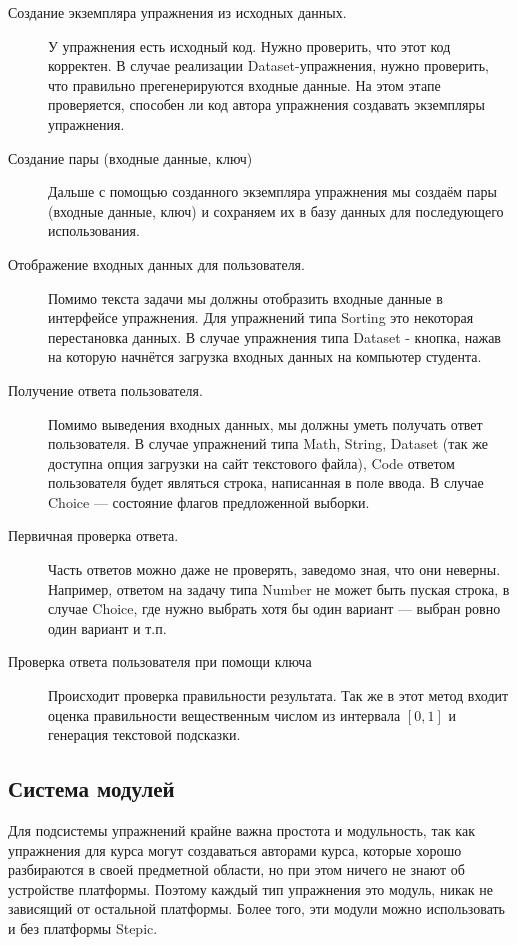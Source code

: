\documentclass{matmex-diploma-custom}
\begin{document}
\begin{description}
\item[Создание экземпляра упражнения из исходных данных.]

  У упражнения есть исходный код. Нужно проверить, что этот код
  корректен. В случае реализации Dataset-упражнения, нужно проверить,
  что правильно прегенерируются входные данные. На этом этапе
  проверяется, способен ли код автора упражнения создавать экземпляры
  упражнения.

\item[Создание пары (входные данные, ключ)]

  Дальше с помощью созданного экземпляра упражнения мы создаём пары
  (входные данные, ключ) и сохраняем их в базу данных для последующего
  использования.

\item[Отображение входных данных для пользователя.]

  Помимо текста задачи мы должны отобразить входные данные в
  интерфейсе упражнения. Для упражнений типа Sorting это некоторая
  перестановка данных. В случае упражнения типа Dataset - кнопка,
  нажав на которую начнётся загрузка входных данных на компьютер
  студента.

\item[Получение ответа пользователя.]

  Помимо выведения входных данных, мы должны уметь получать ответ
  пользователя. В случае упражнений типа Math, String, Dataset (так же
  доступна опция загрузки на сайт текстового файла), Code ответом
  пользователя будет являться строка, написанная в поле ввода. В
  случае Choice --- состояние флагов предложенной выборки.

\item[Первичная проверка ответа.]

  Часть ответов можно даже не проверять, заведомо зная, что они
  неверны. Например, ответом на задачу типа Number не может быть
  пуская строка, в случае Choice, где нужно выбрать хотя бы один
  вариант --- выбран ровно один вариант и т.п.

\item[Проверка ответа пользователя при помощи ключа]

  Происходит проверка правильности результата. Так же в этот метод
  входит оценка правильности вещественным числом из интервала $[0, 1]$
  и генерация текстовой подсказки.
\end{description}

\subsection{Система модулей}
Для подсистемы упражнений крайне важна простота и модульность, так как
упражнения для курса могут создаваться авторами курса, которые хорошо
разбираются в своей предметной области, но при этом ничего не знают об
устройстве платформы. Поэтому каждый тип упражнения это модуль, никак
не зависящий от остальной платформы. Более того, эти модули можно
использовать и без платформы Stepic.
\end{document}
